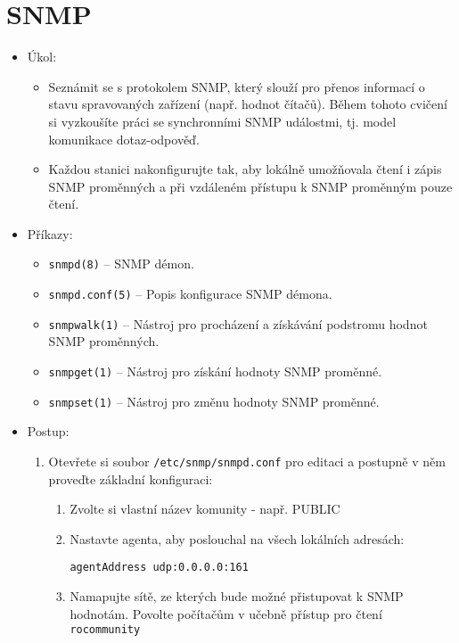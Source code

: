 \section{SNMP}
  \begin{itemize}
    \item Úkol: 
    \begin{itemize}
      \item Seznámit se s  protokolem SNMP, který slouží pro přenos
      informací o stavu spravovaných zařízení (např. hodnot čítačů). Během tohoto cvičení si
      vyzkoušíte práci se synchronními SNMP událostmi, tj. model komunikace dotaz-odpověď.
      \item Každou stanici nakonfigurujte tak, aby lokálně umožňovala čtení i zápis SNMP
      proměnných a při vzdáleném přístupu k SNMP proměnným pouze čtení.
    \end{itemize}
    \item Příkazy:
       \begin{itemize}
            \item {\tt snmpd(8)} -- SNMP démon.
            \item {\tt snmpd.conf(5)} -- Popis konfigurace SNMP démona.
            \item {\tt snmpwalk(1)} -- Nástroj pro procházení a získávání podstromu hodnot SNMP
         proměnných.
            \item {\tt snmpget(1)} -- Nástroj pro získání hodnoty SNMP proměnné.
            \item {\tt snmpset(1)} -- Nástroj pro změnu hodnoty SNMP proměnné.
        \end{itemize}
    \item Postup:
       \begin{enumerate}        
            \item Otevřete si soubor {\tt /etc/snmp/snmpd.conf} pro editaci a postupně
         v něm proveďte základní konfiguraci:
           \begin{enumerate}
               \item Zvolte si vlastní název komunity - např. PUBLIC
           \item Nastavte agenta, aby poslouchal na všech lokálních adresách:
\begin{verbatim}
agentAddress udp:0.0.0.0:161
\end{verbatim}
               \item Namapujte sítě, ze kterých bude možné přistupovat k SNMP
           hodnotám. Povolte počítačům v učebně přístup pro čtení {\tt rocommunity
}
\end{enumerate}
\end{enumerate}
\end{itemize}
